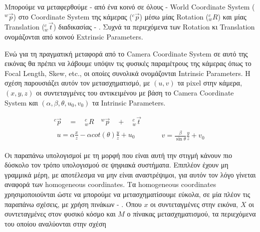 Μπορούμε να μεταφερθούμε - από ένα κοινό σε όλους - World Coordinate System (${}^{w}\overrightarrow{p}$) στο Coordinate System της κάμερας (${}^{c}\overrightarrow{p}$) μέσω μίας Rotation (${}^{c}_{w}R$) και μίας Translation (${}^{c}_{w}\overrightarrow{t}$) διαδικασίας - . Συχνά τα περιεχόμενα των Rotation κι Translation ονομάζονται από κοινού Extrinsic Parameters.

Ενώ για τη πραγματική μεταφορά από το Camera Coordinate System σε αυτό της εικόνας θα πρέπει να λάβουμε υπόψιν τις φυσικές παραμέτρους της κάμερας όπως το Focal Length, Skew, etc., οι οποίες συνολικά ονομάζονται Intrinsic Parameters. Η σχέση  παρουσιάζει αυτόν τον μετασχηματισμό, με $(u,v)$ τα pixel στην κάμερα, $(x,y,z)$ οι συντεταγμένες του αντικειμένου με βάση το Camera Coordinate System και $(\alpha, \beta, \theta, u_0, v_0)$ τα Intrinsic Parameters.


\begin{gather}
	{}^{c}\overrightarrow{p} \quad = \quad {}^{c}_{w}R \quad {}^{w}\overrightarrow{p} \quad + \quad {}^{c}_{w}\overrightarrow{t} \label{eq:world-to-camera-frame}\\
    \begin{matrix}
        u = \alpha \frac{x}{z} - \alpha cot(\theta)\frac{y}{z} + u_0
    \end{matrix} 
    \quad \quad \quad
    \begin{matrix}
        v = \frac{\beta}{\sin{\theta}} \frac{y}{z} + v_0
    \end{matrix} \label{eq:camera-to-image-plane}
\end{gather}

Οι παραπάνω υπολογισμοί με τη μορφή που είναι αυτή την στιγμή κάνουν πιο δύσκολο τον τρόπο υπολογισμού σε ψηφιακά συστήματα. Επιπλέον έχουν μη γραμμικά μέρη, με αποτέλεσμα να μην είναι αναστρέψιμοι, για αυτόν τον λόγο γίνεται αναφορά των homogeneous coordinates. Τα homogeneous coordinates χρησιμοποιούνται ώστε να μπορούμε να μετασχηματίσουμε εύκολα, σε μία πλέον τις παραπάνω σχέσεις, με χρήση πινάκων - . Όπου $x$ οι συντεταγμένες στην εικόνα, $X$ οι συ\-ντε\-τα\-γμέ\-νες στον φυσικό κόσμο και $M$ ο πίνακας μετασχηματισμού, τα περιεχόμενα του οποίου αναλύονται στην σχέση  

